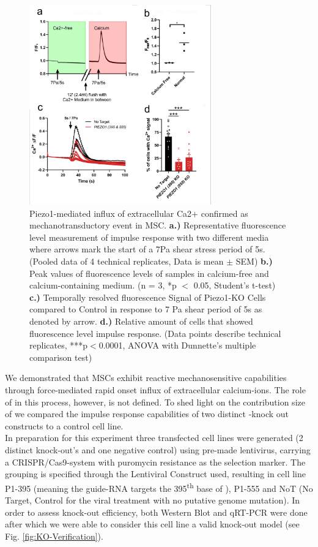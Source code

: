 \begin{figure}
\centering
\includegraphics[width = 0.7\textwidth]{Combined_CalciumFree_KnockOut.png}
\caption{Piezo1-mediated influx of extracellular Ca2+ confirmed as mechanotransductory event in MSC. \hfill \newline 
\textbf{a.)} Representative fluorescence level measurement of impulse response with two different media where arrows mark the start of a 7Pa shear stress period of 5s. (Pooled data of 4 technical replicates, Data is mean $\pm$ SEM)	
\textbf{b.)} Peak values of fluorescence levels of samples in calcium-free and calcium-containing medium. (n = 3, *p $<$ 0.05, Student's t-test) 
\textbf{c.)} Temporally resolved fluorescence Signal of Piezo1-KO Cells compared to Control in response to 7 Pa shear period of 5s as denoted by arrow.  
\textbf{d.)} Relative amount of cells that showed fluorescence level impulse response. (Data points describe technical replicates, ***p$<$0.0001, ANOVA with Dunnette's multiple comparison test)}
\label{fig:CalcImaging_Cells}
\end{figure}

We demonstrated that MSCs exhibit reactive mechanosensitive capabilities through force-mediated rapid onset influx of extracellular calcium-ions. The role of \Piezo{} in this process, however, is not defined. To shed light on the contribution size of \Piezo{} we compared the impulse response capabilities of two distinct \Piezo{}-knock out constructs to a control cell line.\\
In preparation for this experiment three transfected cell lines were generated (2 distinct \Piezo{} knock-out's and one negative control) using pre-made lentivirus, carrying a CRISPR/Cas9-system with puromycin resistance as the selection marker. The grouping is specified through the Lentiviral Construct used, resulting in cell line P1-395 (meaning the guide-RNA targets the 395\textsuperscript{th} base of \PiezoGene{}), P1-555 and NoT (No Target, Control for the viral treatment with no putative genome mutation).  In order to assess knock-out efficiency, both Western Blot and qRT-PCR were done after which we were able to consider this cell line a valid knock-out model (see Fig. \ref{fig:KO-Verification}).\\

